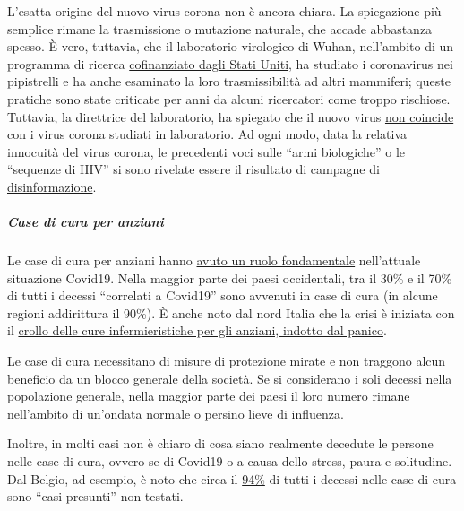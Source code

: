 \begin{itemize}
  L'esatta origine del nuovo virus corona non è ancora chiara. La
  spiegazione più semplice rimane la trasmissione o mutazione naturale,
  che accade abbastanza spesso. È vero, tuttavia, che il laboratorio
  virologico di Wuhan, nell'ambito di un programma di ricerca
  \href{https://www.newsweek.com/dr-fauci-backed-controversial-wuhan-lab-millions-us-dollars-risky-coronavirus-research-1500741}{cofinanziato
  dagli Stati Uniti}, ha studiato i coronavirus nei pipistrelli e ha
  anche esaminato la loro trasmissibilità ad altri mammiferi; queste
  pratiche sono state criticate per anni da alcuni ricercatori come
  troppo rischiose. Tuttavia, la direttrice del laboratorio, ha spiegato
  che il nuovo virus
  \href{https://www.scientificamerican.com/article/how-chinas-bat-woman-hunted-down-viruses-from-sars-to-the-new-coronavirus1/}{non
  coincide} con i virus corona studiati in laboratorio. Ad ogni modo,
  data la relativa innocuità del virus corona, le precedenti voci sulle
  ``armi biologiche'' o le ``sequenze di HIV'' si sono rivelate essere
  il risultato di campagne di
  \href{https://onlinelibrary.wiley.com/doi/full/10.1111/eci.13222}{disinformazione}.
\end{itemize}

\hypertarget{case-di-cura-per-anziani}{%
\subparagraph{\texorpdfstring{\textbf{Case di cura per
anziani}}{Case di cura per anziani}}\label{case-di-cura-per-anziani}}

Le case di cura per anziani hanno
\href{https://ltccovid.org/2020/04/12/mortality-associated-with-covid-19-outbreaks-in-care-homes-early-international-evidence/}{avuto
un ruolo fondamentale} nell'attuale situazione Covid19. Nella maggior
parte dei paesi occidentali, tra il 30\% e il 70\% di tutti i decessi
``correlati a Covid19'' sono avvenuti in case di cura (in alcune regioni
addirittura il 90\%). È anche noto dal nord Italia che la crisi è
iniziata con il
\href{https://swprs.org/covid-19-a-report-from-italy/}{crollo delle cure
infermieristiche per gli anziani, indotto dal panico}.

Le case di cura necessitano di misure di protezione mirate e non
traggono alcun beneficio da un blocco generale della società. Se si
considerano i soli decessi nella popolazione generale, nella maggior
parte dei paesi il loro numero rimane nell'ambito di un'ondata normale o
persino lieve di influenza.

Inoltre, in molti casi non è chiaro di cosa siano realmente decedute le
persone nelle case di cura, ovvero se di Covid19 o a causa dello stress,
paura e solitudine. Dal Belgio, ad esempio, è noto che circa il
\href{https://covid-19.sciensano.be/sites/default/files/Covid19/Meest\%20recente\%20update.pdf}{94\%}
di tutti i decessi nelle case di cura sono ``casi presunti'' non
testati.

